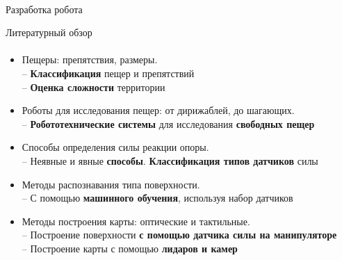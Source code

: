 \documentclass[aspectratio=169,xcolor=table]{beamer}
\begin{document}
\begin{frame}[c]{}
    \framesubtitle{}
    \centering\LARGE Разработка робота
\end{frame}

\begin{frame}[t]{Литературный обзор}
    \framesubtitle{}
    \vspace{-0.65cm}
    \begin{itemize}
        \item Пещеры: препятствия, размеры. \\ \alert{-- \textbf{Классификация} пещер и препятствий \\ -- \textbf{Оценка сложности} территории}
        \item Роботы для исследования пещер: от дирижаблей, до шагающих. \\ \alert{-- \textbf{Робототехнические системы} для исследования \textbf{свободных пещер}}
        \item Способы определения силы реакции опоры. \\ \alert{-- Неявные и явные \textbf{способы}. \textbf{Классификация типов датчиков} силы}
        \item Методы распознавания типа поверхности. \\ \alert{-- С помощью \textbf{машинного обучения}, используя набор датчиков}
        \item Методы построения карты: оптические и тактильные. \\ \alert{-- Построение поверхности \textbf{с помощью датчика силы на манипуляторе} \\ -- Построение карты с помощью \textbf{лидаров и камер}}
    \end{itemize}

\end{frame}
\end{document}
